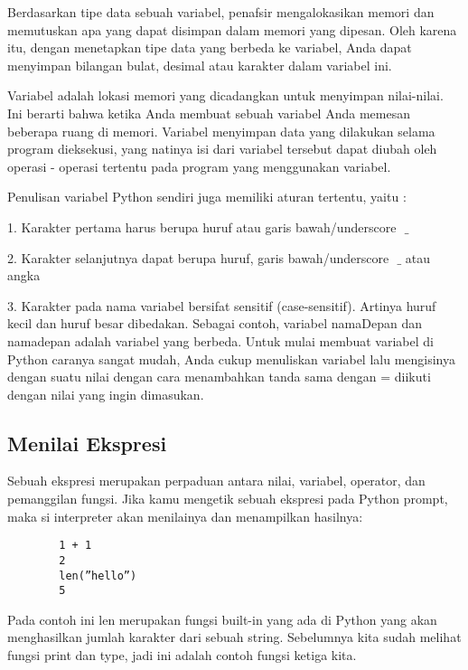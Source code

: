 \vspace{12pt}
\noindent 
Berdasarkan tipe data sebuah variabel, penafsir mengalokasikan memori dan memutuskan apa yang dapat disimpan dalam memori yang dipesan. $  $Oleh karena itu, dengan menetapkan tipe data yang berbeda ke variabel, Anda dapat menyimpan bilangan bulat, desimal atau karakter dalam variabel ini. \par
\vspace{12pt}
\noindent 
Variabel adalah lokasi memori yang dicadangkan untuk menyimpan nilai-nilai. Ini berarti bahwa ketika Anda membuat sebuah variabel Anda memesan beberapa ruang di memori. Variabel menyimpan data yang dilakukan selama program dieksekusi, yang natinya isi dari variabel tersebut dapat diubah oleh operasi - operasi tertentu pada program yang menggunakan variabel.\vspace{\baselineskip}
 \par
\noindent 
\vspace{\baselineskip}
Penulisan variabel Python sendiri juga memiliki aturan tertentu, yaitu : \par
\noindent 
\vspace{\baselineskip}
1. Karakter pertama harus berupa huruf atau garis bawah/underscore $  $ $  \_  $ \par
\noindent 
\vspace{\baselineskip}
2. Karakter selanjutnya dapat berupa huruf, garis bawah/underscore $  $ $  \_  $ $  $atau angka \par
\noindent 
\vspace{\baselineskip}
3. Karakter pada nama variabel bersifat sensitif (case-sensitif). Artinya huruf kecil dan huruf besar dibedakan. Sebagai contoh, variabel $  $namaDepan $  $dan $  $namadepan $  $adalah variabel yang berbeda.\vspace{\baselineskip}
\vspace{\baselineskip}
Untuk mulai membuat variabel di Python caranya sangat mudah, Anda cukup menuliskan variabel lalu mengisinya dengan suatu nilai dengan cara menambahkan tanda sama dengan $  $= $  $diikuti dengan nilai yang ingin dimasukan. \par
\vspace{12pt}
\noindent 
\subsection{Menilai Ekspresi}
Sebuah ekspresi merupakan perpaduan antara nilai, variabel, operator, dan pemanggilan fungsi. Jika kamu mengetik sebuah ekspresi pada Python prompt, maka si interpreter akan menilainya dan menampilkan hasilnya:
	\begin{verbatim}
		1 + 1 
		2 
		len(”hello”) 
		5 
	\end{verbatim}
Pada contoh ini len merupakan fungsi built-in yang ada di Python yang akan menghasilkan jumlah karakter dari sebuah string. Sebelumnya kita sudah melihat fungsi print dan type, jadi ini adalah contoh fungsi ketiga kita.

